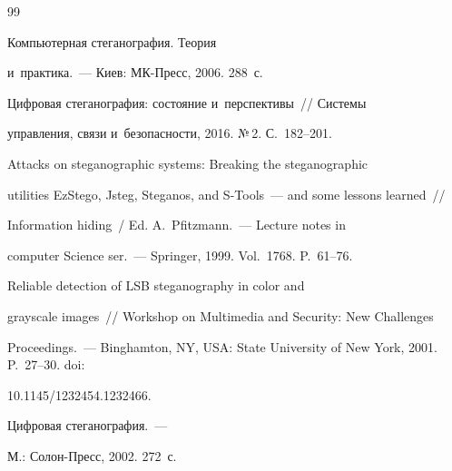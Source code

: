 {\small\frenchspacing


{%




\begin{thebibliography}{99}




 Компьютерная стеганография. Теория 


и~практика.~--- Киев: МК-Пресс, 2006. 288~с.




 Цифровая стеганография: состояние и~перспективы~/\!\!/ Сис\-те\-мы 


управ\-ле\-ния, связи и~безопас\-ности, 2016. №\,2. С.~182--201.







 Attacks on steganographic systems: Breaking the steganographic 


utilities EzStego, Jsteg, Steganos, and S-Tools~--- and some lessons learned~/\!\!/ 


  Information hiding~/ Ed. A.~Pfitzmann.~--- Lecture notes in 


computer Science ser.~--- Springer, 1999. Vol.~1768. P.~61--76.







 Reliable detection of LSB steganography in color and 


grayscale images~/\!\!/ Workshop on Multimedia and Security: New Challenges 


Proceedings.~--- Binghamton, NY, USA: State University of New York, 2001. P.~27--30. doi: 


10.1145/1232454.1232466.







 Цифровая стеганография.~---  


М.: Солон-Пресс, 2002. 272~с.











\end{thebibliography}}}
